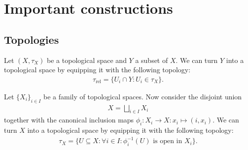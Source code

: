 
\section{Important constructions}
\subsection{Topologies}

    \begin{example}\label{topology:relative_topology}
        Let $(X, \tau_X)$ be a topological space and $Y$ a subset of $X$. We can turn $Y$ into a topological space by equipping it with the following topology:
        \begin{gather}
            \tau_\text{rel} = \big\{U_i\cap Y:U_i\in \tau_X\big\}.
        \end{gather}
    \end{example}

    \begin{example}\label{topology:disjoint_union}
        Let $\{X_i\}_{i\in I}$ be a family of topological spaces. Now consider the disjoint union
        \begin{gather}
            X = \bigsqcup_{i\in I} X_i
        \end{gather}
        together with the canonical inclusion maps $\phi_i:X_i\rightarrow X:x_i\mapsto(i, x_i)$. We can turn $X$ into a topological space by equipping it with the following topology:
        \begin{gather}
            \tau_X = \big\{U\subseteq X:\forall i\in I:\phi_i^{-1}(U)\text{ is open in }X_i\big\}.
        \end{gather}
    \end{example}

